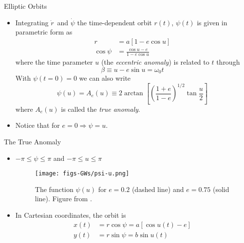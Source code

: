 \documentclass[size=11pt,style=paintings]{powerdot}
\begin{document}
   \begin{slide}{Elliptic Orbits}
 \begin{itemize}
 \item Integrating $\dot r$\ and $\dot \psi$ the time-dependent orbit $r(t)$, $\psi(t)$ is given in parametric form as 
\begin{equation}
\begin{aligned} r &=a[1-e \cos u] \\ \cos \psi &=\frac{\cos u-e}{1-e \cos u} \end{aligned}
\end{equation}
where the time parameter $u$ (the \textit{eccentric anomaly}) is related to $t$ through
\begin{equation}
\boxed{\beta \equiv u-e \sin u=\omega_{0} t}
\end{equation}
With $\psi(t=0)=0$ we can also write
\begin{equation}
\psi(u)=A_{e}(u) \equiv 2 \arctan \left[\left(\frac{1+e}{1-e}\right)^{1 / 2} \tan \frac{u}{2}\right]
\end{equation}
where $A_e(u)$ is called the \textit{true anomaly}. 
\vskip 0.3cm
\item Notice that for $e=0
\Rightarrow\psi=u$.
\end{itemize}
 \end{slide}
 
   \begin{slide}{The True Anomaly}
 \begin{itemize}
 \item  $-\pi\leq \psi \leq\pi$ and  $-\pi\leq u \leq\pi$
 \begin{figure}
  \centering
   \texttt{[image: figs-GWs/psi-u.png]}
  \caption{The function $\psi(u)$ for $e=0.2$ (dashed line) and $e=0.75$ (solid line). Figure from \cite{2008-Maggiore}.}
\label{fig:polarization}
\end{figure}
\item In Cartesian coordinates, the orbit is 
\begin{equation}
\begin{aligned} x(t) &=r \cos \psi =a[\cos u(t)-e] \\ y(t) &=r \sin \psi =b \sin u(t) \end{aligned}
\end{equation}
 \end{itemize}
 \end{slide}
 
\end{document}
